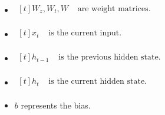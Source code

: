\documentclass{ieeeojies}
\begin{document}
\begin{itemize}
    \item $\begin{aligned}[t]
            W_z, W_t, W & \text{ are weight matrices.} \\
            \end{aligned}$
    \item $\begin{aligned}[t]
            x_t & \text{ is the current input.} \\
            \end{aligned}$
    \item $\begin{aligned}[t]
            h_{t-1} & \text{ is the previous hidden state.} \\
            \end{aligned}$
   \item $\begin{aligned}[t]
            h_t & \text{ is the current hidden state.} \\
            \end{aligned}$     
    \item $b$ represents the bias.
\end{itemize}
\end{document}
